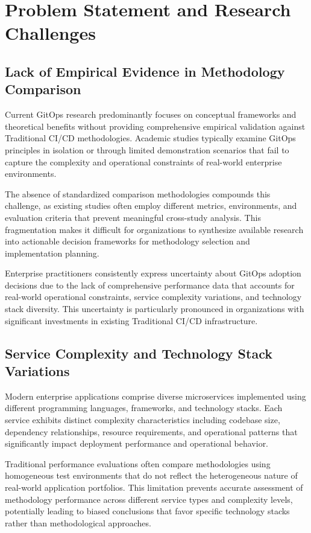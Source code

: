 \section{Problem Statement and Research Challenges}

\subsection{Lack of Empirical Evidence in Methodology Comparison}
Current GitOps research predominantly focuses on conceptual frameworks and theoretical benefits without providing comprehensive empirical validation against Traditional CI/CD methodologies. Academic studies typically examine GitOps principles in isolation or through limited demonstration scenarios that fail to capture the complexity and operational constraints of real-world enterprise environments.

The absence of standardized comparison methodologies compounds this challenge, as existing studies often employ different metrics, environments, and evaluation criteria that prevent meaningful cross-study analysis. This fragmentation makes it difficult for organizations to synthesize available research into actionable decision frameworks for methodology selection and implementation planning.

Enterprise practitioners consistently express uncertainty about GitOps adoption decisions due to the lack of comprehensive performance data that accounts for real-world operational constraints, service complexity variations, and technology stack diversity. This uncertainty is particularly pronounced in organizations with significant investments in existing Traditional CI/CD infrastructure.

\subsection{Service Complexity and Technology Stack Variations}
Modern enterprise applications comprise diverse microservices implemented using different programming languages, frameworks, and technology stacks. Each service exhibits distinct complexity characteristics including codebase size, dependency relationships, resource requirements, and operational patterns that significantly impact deployment performance and operational behavior.

Traditional performance evaluations often compare methodologies using homogeneous test environments that do not reflect the heterogeneous nature of real-world application portfolios. This limitation prevents accurate assessment of methodology performance across different service types and complexity levels, potentially leading to biased conclusions that favor specific technology stacks rather than methodological approaches.

